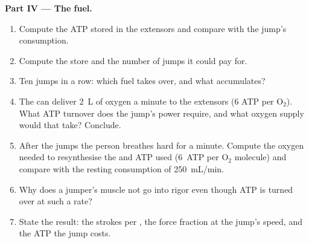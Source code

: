 \begin{problem}
\medskip
\noindent\textbf{Part IV --- The fuel.}
\begin{enumerate}[resume]
  \item Compute the ATP stored in the extensors and compare with the
        jump's consumption.
  \item Compute the  store and the number of jumps
        it could pay for.
  \item Ten jumps in a row: which fuel takes over, and what
        accumulates?
  \item The  can deliver \qty{2}{L} of oxygen a minute to the
        extensors (6 ATP per $\mathrm{O_2}$). What ATP turnover does
        the jump's power require, and what oxygen supply would that
        take? Conclude.
  \item After the jumps the person breathes hard for a minute.
        Compute the oxygen needed to resynthesise the  and ATP used (\qty{6}{ATP} per $\mathrm{O_2}$
        molecule) and compare with the resting consumption of
        \qty{250}{mL/min}.
  \item Why does a jumper's muscle not go into rigor even though ATP
        is turned over at such a rate?
  \item State the result: the strokes per , the force
        fraction at the jump's speed, and the ATP the jump costs.
\end{enumerate}
\end{problem}
